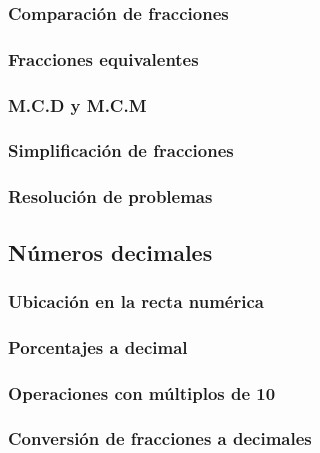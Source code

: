 \documentclass[12pt,addpoints]{evalua3}
\begin{document}
\begin{questions}
	\subsubsection{Comparación de fracciones}
	\question{}
	\subsubsection{Fracciones equivalentes}
	\question{}
	\subsubsection{M.C.D y M.C.M}
	\question{}
	\subsubsection{Simplificación de fracciones}
	\question{}
	\subsubsection{Resolución de problemas}
	\question{}

	\subsection   {Números decimales}
	\subsubsection{Ubicación en la recta numérica}
	\question{}
	\subsubsection{Porcentajes a decimal}
	\question{}
	\subsubsection{Operaciones con múltiplos de 10}
	\question{}
	\subsubsection{Conversión de fracciones a decimales}
	\question{}

\end{questions}
\end{document}
